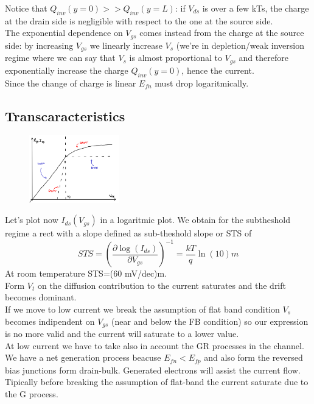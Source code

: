 Notice that $Q_{inv}(y=0)>>Q_{inv}(y=L)$: if $V_{ds}$ is over a few kTs, the charge at the drain side is negligible with respect to the one at the source side.\\
The exponential dependence on $V_{gs}$ comes instead from the charge at the source side: by increasing $V_{gs}$ we linearly increase $V_s$ (we're in depletion/weak inversion regime where we can say that $V_s$ is almost proportional to $V_{gs}$ and therefore exponentially increase the charge $Q_{inv}(y=0)$, hence the current.\\
Since the change of charge is linear $E_{fn}$ must drop logaritmically.\\


\subsection{Transcaracteristics}

\begin{figure}
\includegraphics[width=0.35\textwidth]{tranclog.png}
\end{figure}

Let's plot now $I_{ds}(V_{gs})$ in a logaritmic plot. We obtain for the subtheshold regime a rect with a slope defined as sub-theshold slope or STS of 
\begin{equation}
STS=\left(\frac{\partial \log(I_{ds})}{\partial V_{gs}}\right)^{-1}=\frac{kT}{q}\ln(10)m
\end{equation} 
At room temperature STS=(60 mV/dec)m.\\ 
Form $V_t$ on the diffusion contribution to the current saturates and the drift becomes dominant.\\
If we move to low current we break the assumption of flat band condition $V_s$ becomes indipendent on $V_{gs}$ (near and below the FB condition) so our expression is no more valid and the current will saturate to a lower value.\\
At low current we have to take also in account the GR processes in the channel. We have a net generation process beacuse $E_{fn}<E_{fp}$ and also form the reversed bias junctions form drain-bulk. Generated electrons will assist the current flow. Tipically before breaking the assumption of flat-band the current saturate due to the G process.\\

